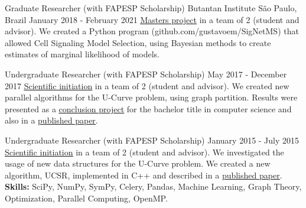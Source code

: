 \documentclass[11pt, a4paper]{awesome-cv-res}
\begin{document}
\begin{cventries}
\cventry
{Graduate Researcher (with FAPESP Scholarship)}
{Butantan Institute}
{São Paulo, Brazil}
{January 2018 - February 2021}
{\href{https://bv.fapesp.br/en/bolsas/175684/identification-of-cell-signaling-pathways-based-on-biochemical-reaction-kinetics-repositories/}
{\color{awesome}\underline {Masters project}} in a team of 2 (student 
    and advisor). We created a Python program 
    (github.com/gustavoem/SigNetMS) that allowed Cell Signaling Model
    Selection, using Bayesian methods to create estimates of marginal
    likelihood of models.
}

\cventry
{Undergraduate Researcher (with FAPESP Scholarship)}
{}
{}
{May 2017 - December 2017}
{\href{https://bv.fapesp.br/en/bolsas/170553/design-of-poset-forest-based-algorithms-for-the-u-curve-optimization-problem/}
{\color{awesome} \underline{Scientific initiation}} in a team of 2 
    (student and advisor). We created new parallel 
    algorithms for the U-Curve problem, using graph partition.  
    Results were presented as a
    \href{https://gustavoem.github.io/ucurve-pfs/index.html}{\color{awesome}
    \underline{conclusion project}} for the bachelor title in computer
    science and also in a
    \href{https://www.mdpi.com/1099-4300/22/4/492}{\color{awesome}\underline{published paper}}.}

\cventry
{Undergraduate Researcher (with FAPESP Scholarship)}
{}
{}
{January 2015 - July 2015}
{\href{https://bv.fapesp.br/en/bolsas/156441/studies-of-efficient-data-structures-to-tackle-the-u-curve-optimization-problem/}
{\color{awesome} \underline{Scientific initiation}} in a team of 2 
    (student and advisor). We investigated the usage of new  data 
    structures for the U-Curve problem. We created a  new algorithm,
    UCSR, implemented in C++ and described in a 
    \href{https://www.sciencedirect.com/science/article/pii/S0020025518306789?via\%3Dihub}
    {\color{awesome}\underline{published paper}}.
\newline\textbf{Skills:} SciPy, NumPy, SymPy, Celery, Pandas, 
Machine Learning, Graph Theory, Optimization, Parallel Computing, OpenMP. 
}
\end{cventries}
\end{document}
